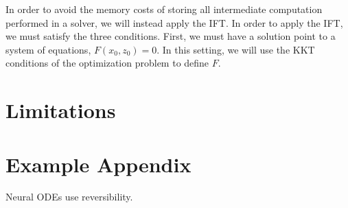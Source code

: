 \documentclass[11pt]{article}
\begin{document}
In order to avoid the memory costs of storing all intermediate computation performed
in a solver, we will instead apply the IFT.
In order to apply the IFT, we must satisfy the three conditions.
First, we must have a solution point to a system of equations, $F(x_0, z_0) = 0$.
In this setting, we will use the KKT conditions of the optimization problem to define $F$.

\section{Limitations}



\appendix

\section{Example Appendix}
\label{sec:appendix}

Neural ODEs use reversibility.
\end{document}
